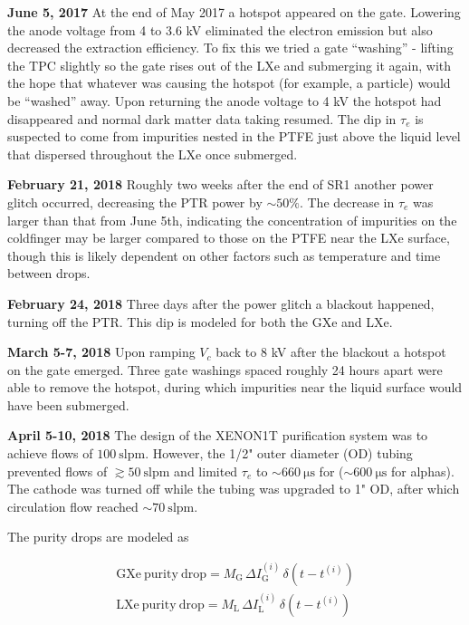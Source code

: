 \textbf{June 5, 2017}  At the end of May 2017 a hotspot appeared on the gate.  Lowering the anode voltage from 4 to 3.6 kV eliminated the
electron emission but also decreased the extraction efficiency.  To fix this we tried a gate ``washing'' - lifting the TPC
slightly so the gate rises out of the LXe and submerging it again, with the hope that whatever was causing the hotspot (for example, a
particle) would be ``washed''
away.  Upon returning the anode voltage to 4 kV the hotspot had disappeared and normal dark matter data taking resumed.  The dip in
$\tau_e$ is suspected to come from impurities nested in the PTFE just above the liquid level that dispersed throughout the LXe once
submerged.

\textbf{February 21, 2018}  Roughly two weeks after the end of SR1 another power glitch occurred, decreasing the PTR power by
${\sim} 50\%$.  The decrease in $\tau_e$ was larger than that from June 5th, indicating the concentration of impurities on the
coldfinger may be larger compared to those on the PTFE near the LXe surface, though this is likely dependent on other factors such as
temperature and time between drops.

\textbf{February 24, 2018}  Three days after the power glitch a blackout happened, turning off the PTR.  This dip is modeled
for both the GXe and LXe.

\textbf{March 5-7, 2018}  Upon ramping $V_c$ back to 8 kV after the blackout a hotspot on the gate emerged.  Three gate washings spaced
roughly 24 hours apart were able to remove the hotspot, during which impurities near the liquid surface would have been submerged.

\textbf{April 5-10, 2018}  The design of the XENON1T purification system was to achieve flows of $100\ \mathrm{slpm}$.  However, the
1/2" outer diameter (OD) tubing prevented flows of $\gtrsim 50\ \mathrm{slpm}$ and limited $\tau_e$ to ${\sim} 660\ \mathrm{\mu s}$ for
\metakr (${\sim} 600\ \mathrm{\mu s}$ for alphas).  The cathode was turned off while the tubing was upgraded to 1" OD, after which
circulation flow reached ${\sim} 70\ \mathrm{slpm}$.

The purity drops are modeled as

\begin{subequations}
\begin{align}
\mathrm{GXe\ purity\ drop} = M_{\mathrm{G}}\, \Delta I_{\mathrm{G}}^{(i)}\, \delta (t - t^{(i)})
\\
\mathrm{LXe\ purity\ drop} = M_{\mathrm{L}}\, \Delta I_{\mathrm{L}}^{(i)}\, \delta (t - t^{(i)})
\end{align}
\end{subequations}

